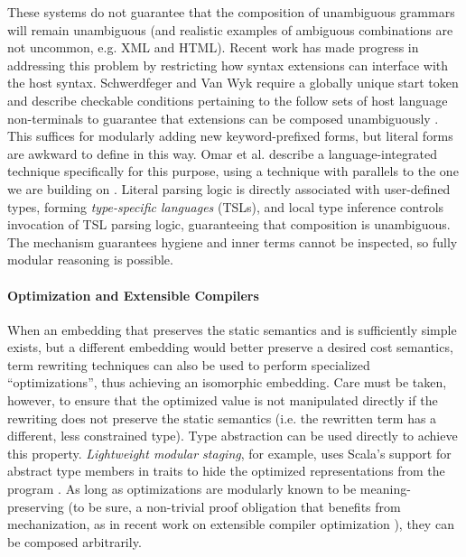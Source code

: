 \documentclass[9pt,preprint]{sigplanconf}
\begin{document}
These systems do not guarantee that the composition of unambiguous grammars will remain unambiguous (and realistic examples of ambiguous combinations are not uncommon, e.g. XML and HTML). %
Recent work has made progress in addressing this problem by restricting how syntax extensions can interface with the host syntax. Schwerdfeger and Van Wyk require a globally unique start token and describe checkable conditions pertaining to the follow sets of host language non-terminals to guarantee that extensions can be composed unambiguously \cite{conf/pldi/SchwerdfegerW09}. This suffices for modularly adding new keyword-prefixed forms, but literal forms are awkward to define in this way. Omar et al. describe a language-integrated technique specifically for this purpose, using a technique with parallels to the one we are building on \cite{TSLs}. Literal parsing logic is directly associated with user-defined types, forming \emph{type-specific languages} (TSLs), and local type inference controls invocation of TSL parsing logic, guaranteeing that composition is unambiguous. The mechanism guarantees hygiene and inner terms cannot be inspected, so  fully modular reasoning is possible.


\paragraph{Optimization and Extensible Compilers}
When an embedding that preserves the static semantics and is sufficiently simple exists, but a different embedding would better preserve a desired cost semantics, term rewriting techniques can also be used to perform specialized ``optimizations'', thus achieving an isomorphic embedding. Care must be taken, however, to ensure that the optimized value is not manipulated directly if the rewriting does not preserve the static semantics (i.e. the rewritten term has a different, less constrained type). Type abstraction can be used directly to achieve this property. \emph{Lightweight modular staging}, for example, uses Scala's support for abstract type members in traits to hide the optimized representations from the program \cite{Rompf:2012:LMS}. As long as optimizations are modularly known to be meaning-preserving (to be sure, a non-trivial proof obligation that benefits from mechanization, as in recent work on extensible compiler optimization \cite{conf/pldi/TatlockL10}), they can be composed arbitrarily. %
\end{document}
